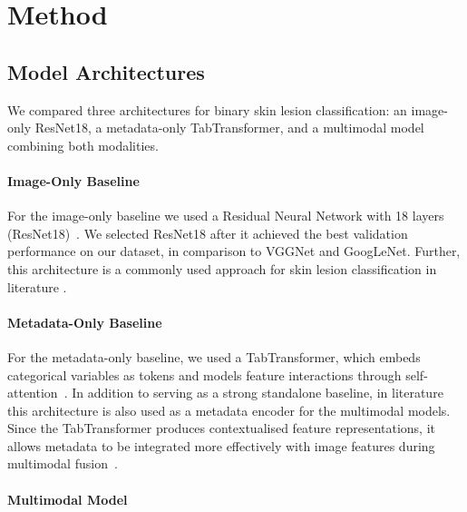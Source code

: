 \documentclass{article}
\begin{document}
	
	\section{Method}
	
	\subsection{Model Architectures}
	We compared three architectures for binary skin lesion classification: an image-only ResNet18, a metadata-only TabTransformer, and a multimodal model combining both modalities.
	
	\paragraph{Image-Only Baseline}
	For the image-only baseline we used a Residual Neural Network with 18 layers (ResNet18)~\citep{he2015deepresiduallearningimage}. %
	We selected ResNet18 after it achieved the best validation performance on our dataset, in comparison to VGGNet and GoogLeNet. Further, this architecture is a commonly used approach for skin lesion classification in literature \citep{7893267, yu2025ai, wu2022skin}.
	
	
	\paragraph{Metadata-Only Baseline}
	
	For the metadata-only baseline, we used a TabTransformer, which embeds categorical variables as tokens and models feature interactions through self-attention~\citep{huang2020tabtransformer}. %
	In addition to serving as a strong standalone baseline, in literature this architecture is also used as a metadata encoder for the multimodal models. Since the TabTransformer produces contextualised feature representations, it allows metadata to be integrated more effectively with image features during multimodal fusion~\citep{sravani2025transformer}.
	
	\paragraph{Multimodal Model}
	
\end{document}

